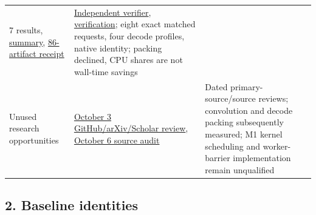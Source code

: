 \documentclass[10pt,a4paper]{article}
\begin{document}
\begin{longtable}[]{@{}lll@{}}
\begin{minipage}[t]{0.30\columnwidth}
{7 results},
\href{https://github.com/MoyaMryia/riscv-accl/blob/main/spacemit/reports/raw/k1-decode-audit-20261007-074314/summary.json}{summary},
\href{https://github.com/MoyaMryia/riscv-accl/blob/main/spacemit/reports/raw/k1-decode-audit-20261007-074314/collection-receipt.json}{86-artifact
receipt}\strut
\end{minipage} & \begin{minipage}[t]{0.30\columnwidth}\raggedright
\href{https://github.com/MoyaMryia/riscv-accl/blob/main/spacemit/reports/raw/k1-decode-analysis-20261007/verify-completion.py}{Independent
verifier},
\href{https://github.com/MoyaMryia/riscv-accl/blob/main/spacemit/reports/raw/k1-decode-analysis-20261007/verification.json}{verification};
eight exact matched requests, four decode profiles, native identity;
packing declined, CPU shares are not wall-time savings\strut
\end{minipage}\tabularnewline
\begin{minipage}[t]{0.30\columnwidth}\raggedright
Unused research opportunities\strut
\end{minipage} & \begin{minipage}[t]{0.30\columnwidth}\raggedright
\href{https://github.com/MoyaMryia/riscv-accl/blob/main/spacemit/reports/2026-10-03-infrastructure-research.md}{October
3 GitHub/arXiv/Scholar review},
\href{https://github.com/MoyaMryia/riscv-accl/blob/main/spacemit/reports/2026-10-06-next-infrastructure-methods.md}{October
6 source audit}\strut
\end{minipage} & \begin{minipage}[t]{0.30\columnwidth}\raggedright
Dated primary-source/source reviews; convolution and decode packing
subsequently measured; M1 kernel scheduling and worker-barrier
implementation remain unqualified\strut
\end{minipage}\tabularnewline
\bottomrule
\end{longtable}

\hypertarget{baseline-identities}{%
\subsection{2. Baseline identities}\label{baseline-identities}}
\end{document}
